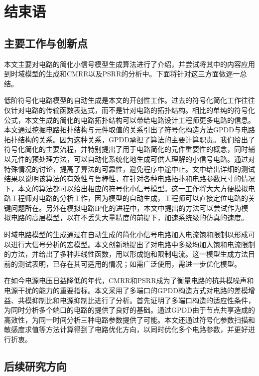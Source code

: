 \chapter{结束语}
\label{chap:con}

\section{主要工作与创新点}
\label{sec:con:job}

本文主要对电路的简化小信号模型生成算法进行了介绍，并尝试将其中的内容应用到时域模型的生成和CMRR以及PSRR的分析中。下面将针对这三方面做逐一总结。

低阶符号化电路模型的自动生成是本文的开创性工作。过去的符号化简化工作往往仅针对电路的传输函数表达式，而不是针对电路的拓扑结构。相比的单纯的符号化公式，本文生成的简化的电路拓扑结构可以带给电路设计工程师更多电路的信息。本文通过挖掘电路拓扑结构与元件取值的关系引出了符号化构造方法GPDD与电路拓扑结构的关系。因为这种关系，GPDD承担了算法的主要计算职责。我们给出了符号化简化的主要流程，并特别提出了用于电路简化的元件重要性的概念，同时辅以元件的预处理方法，可以自动化系统化地生成可供人理解的小信号电路。通过对特殊情况的讨论，提高了算法的可靠性，避免程序中途中止。文中给出详细的测试结果以说明该算法的有效性与鲁棒性，在针对各种电路拓扑和电路参数尺寸的情况下，本文的算法都可以给出相应的符号化小信号模型。这一工作将大大方便模拟电路工程师对电路的分析工作，因为模型的自动生成，工程师可以直接定位电路的关键问题所在。另外在模拟电路IP化的进程中，本文中提出的方法可以尝试作为模拟电路的高层模型，以在不丢失大量精度的前提下，加速系统级的仿真的速度。

时域电路模型的生成通过在自动生成的简化小信号电路加入电流饱和限制以形成可以进行大信号分析的宏模型。本文创新地提出了对电路中多级均加入饱和电流限制的方法，并给出了多种非线性函数，用以形成饱和限制电流。这一模型生成方法目前的测试表明，已存在其可适用的情况；如需广泛使用，需进一步优化模型。

在如今电源电压日益降低的年代，CMRR和PSRR成为了衡量电路的抗共模噪声和电源干扰的能力的重要指标。本文采用了多端口的GPDD构造方式对电路的差模增益、共模抑制比和电源抑制比进行了分析。首先证明了多端口构造的适应性条件，为同时分析多个端口的电路的提供了良好的基础。通过GPDD由于节点共享造成的高效性，为同一时间分析三种电路参数提供了可能。本文还通过符号化参数扫描和敏感度求值等方法计算得到了电路优化方向，以同时优化多个电路参数，并更好进行折衷。

\section{后续研究方向}
\label{sec:con:future}

